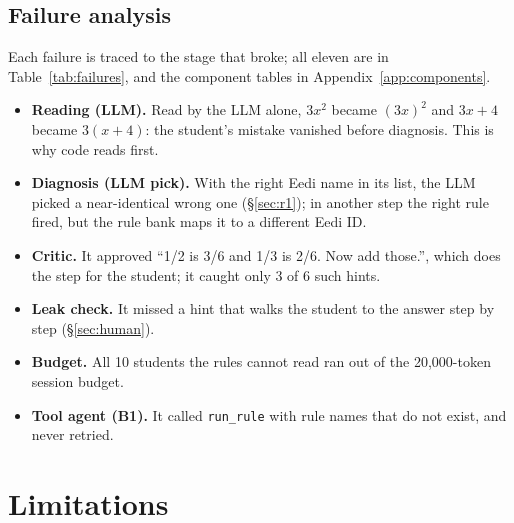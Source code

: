 \documentclass[11pt,a4paper]{article}
\newcommand{\code}[1]{\texttt{#1}}
\begin{document}
\subsection{Failure analysis}\label{sec:failures}

Each failure is traced to the stage that broke; all eleven are in Table~\ref{tab:failures}, and the component tables in Appendix~\ref{app:components}.
\begin{itemize}
  \item \textbf{Reading (LLM).} Read by the LLM alone, $3x^2$ became $(3x)^2$ and $3x + 4$ became $3(x + 4)$: the student's mistake vanished before diagnosis. This is why code reads first.
  \item \textbf{Diagnosis (LLM pick).} With the right Eedi name in its list, the LLM picked a near-identical wrong one (\S\ref{sec:r1}); in another step the right rule fired, but the rule bank maps it to a different Eedi ID.
  \item \textbf{Critic.} It approved ``1/2 is 3/6 and 1/3 is 2/6. Now add those.'', which does the step for the student; it caught only 3 of 6 such hints.
  \item \textbf{Leak check.} It missed a hint that walks the student to the answer step by step (\S\ref{sec:human}).
  \item \textbf{Budget.} All 10 students the rules cannot read ran out of the 20,000-token session budget.
  \item \textbf{Tool agent (B1).} It called \code{run\_rule} with rule names that do not exist, and never retried.
\end{itemize}


\section{Limitations}\label{sec:limits}
\end{document}
